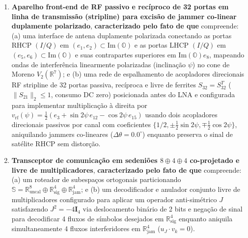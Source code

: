 \documentclass[12pt,a4paper]{article}
\begin{document}
\begin{enumerate}[leftmargin=20pt,itemsep=4pt]
    \item \textbf{Aparelho front-end de RF passivo e rec\'iproco de 32 portas em linha de transmiss\~ao (stripline) para excis\~ao de jammer co-linear duplamente polarizado}, \textbf{caracterizado pelo fato de que} compreende: (a) uma interface de antena duplamente polarizada conectando as portas RHCP $(I/Q)$ em $(e_1, e_2) \subset \mathrm{Im}(\mathbb{O})$ e as portas LHCP $(I/Q)$ em $(e_5, e_6) \subset \mathrm{Im}(\mathbb{O})$ e suas contrapartes superiores em $\mathrm{Im}(\mathbb{O})e_8$, mapeando ondas de interfer\^encia linearmente polarizadas (inclina\c{c}\~ao $\psi$) no cone de Moreno $V_2(\mathbb{R}^7)$; e (b) uma rede de espalhamento de acopladores direcionais RF stripline de 32 portas passiva, rec\'iproca e livre de ferrites $S_{32} = S_{32}^T$ ($\|S_{21}\|_2 \le 1$, consumo DC zero) posicionada antes do LNA e configurada para implementar multiplica\c{c}\~ao \`a direita por $v_{\mathrm{rf}}(\psi) = \frac{1}{2}(e_3 + \sin 2\psi\,e_{12} - \cos 2\psi\,e_{15})$ usando dois acopladores direcionais passivos por canal com coeficientes $\{1/2, \pm\frac{1}{2}\sin 2\psi, \mp\frac{1}{2}\cos 2\psi\}$, aniquilando jammers co-lineares ($\Delta\theta = 0.0^\circ$) enquanto preserva o sinal de sat\'elite RHCP sem distor\c{c}\~ao.

    \item \textbf{Transceptor de comunica\c{c}\~ao em sedeni\~oes $8\oplus 4\oplus 4$ co-projetado e livre de multiplicadores}, \textbf{caracterizado pelo fato de que} compreende: (a) um roteador de subespa\c{c}os ortogonais particionando $\mathbb{S} = \mathbb{R}^8_{\mathrm{uncal}} \oplus \mathbb{R}^4_{\mathrm{sig}} \oplus \mathbb{R}^4_{\mathrm{jam}}$; e (b) um decodificador e anulador conjunto livre de multiplicadores configurado para aplicar um operador anti-sim\'etrico $J$ satisfazendo $J^2 = -4\mathbf{I}_4$ via deslocamento bin\'ario de 2 bits e nega\c{c}\~ao de sinal para decodificar 4 fluxos de s\'imbolos desejados em $\mathbb{R}^4_{\mathrm{sig}}$ enquanto aniquila simultaneamente 4 fluxos interferidores em $\mathbb{R}^4_{\mathrm{jam}}$ ($u_J \cdot v_k = 0$).


\end{enumerate}
\end{document}
